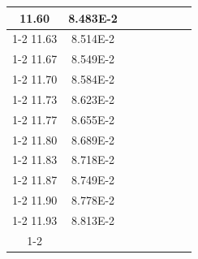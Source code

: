 \documentclass[article,12pt]{elsarticle}
\begin{document}
\begin{longtable}[c]{|c|c|cccccc}
11.60    & 8.483E-2  &                       &                              &                            &                       &                              &                               \\ \cline{1-2}
11.63    & 8.514E-2  &                       &                              &                            &                       &                              &                               \\ \cline{1-2}
11.67    & 8.549E-2  &                       &                              &                            &                       &                              &                               \\ \cline{1-2}
11.70    & 8.584E-2  &                       &                              &                            &                       &                              &                               \\ \cline{1-2}
11.73    & 8.623E-2  &                       &                              &                            &                       &                              &                               \\ \cline{1-2}
11.77    & 8.655E-2  &                       &                              &                            &                       &                              &                               \\ \cline{1-2}
11.80    & 8.689E-2  &                       &                              &                            &                       &                              &                               \\ \cline{1-2}
11.83    & 8.718E-2  &                       &                              &                            &                       &                              &                               \\ \cline{1-2}
11.87    & 8.749E-2  &                       &                              &                            &                       &                              &                               \\ \cline{1-2}
11.90    & 8.778E-2  &                       &                              &                            &                       &                              &                               \\ \cline{1-2}
11.93    & 8.813E-2  &                       &                              &                            &                       &                              &                               \\ \cline{1-2}

\end{longtable}
\end{document}
